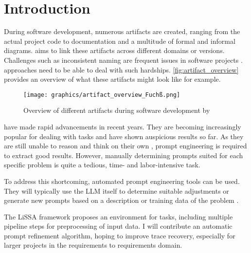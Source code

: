 
\chapter{Introduction}
\label{ch:Introduction}
During software development, numerous artifacts are created, ranging from the actual project code to documentation and a multitude of formal and informal diagrams. \TLR aims to link these artifacts across different domains or versions. Challenges such as inconsistent naming are frequent issues in software projects \cite{wohlrab2019ImprovingConsistency}. \TLR approaches need to be able to deal with such hardships. \autoref{fig:artifact_overview} provides an overview of what these artifacts might look like for example.

\begin{figure}
    \centering
    \texttt{[image: graphics/artifact\_overview\_Fuchß.png]}
    \caption{Overview of different artifacts during software development by }
    \label{fig:artifact_overview}
\end{figure}

\LLMs have made rapid advancements in recent years. They are becoming increasingly popular for dealing with \TLR tasks and have shown auspicious results so far. As they are still unable to reason and think on their own \cite{shojaee2025IllusionThinking}, prompt engineering is required to extract good results. However, manually determining prompts suited for each specific problem is quite a tedious, time- and labor-intensive task.

To address this shortcoming, automated prompt engineering tools can be used. They will typically use the LLM itself to determine suitable adjustments or generate new prompts based on a description or training data of the problem \cite{ramnath2025SystematicSurvey}.

The LiSSA framework \cite{fuchss2025LiSSAGeneric} proposes an environment for \TLR tasks, including multiple pipeline steps for preprocessing of input data. 
I will contribute an automatic prompt refinement algorithm, hoping to improve trace recovery, especially for larger projects in the requirements to requirements domain.
